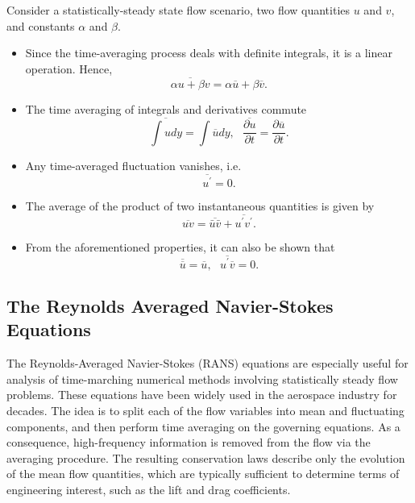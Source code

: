 Consider a statistically-steady state flow scenario, two flow quantities $u$ and $v$, and constants $\alpha$ and $\beta$.

\begin{itemize}
\item Since the time-averaging process deals with definite integrals, it is a linear operation. Hence, 
\begin{equation}
	\overline{\alpha u + \beta v} = \alpha \overline{u} + \beta \overline{v}.
	\label{eq:reynolds_sum}
\end{equation}
\item The time averaging of integrals and derivatives commute
\begin{equation}
	\overline{\int u dy} = \int \overline{u} dy,  ~~~ \overline{\frac{\partial u}{\partial t}} = \frac{\partial \overline{u}}{\partial t}.
	\label{eq:reynolds_commute}
\end{equation}
\item Any time-averaged fluctuation vanishes, i.e. 
\begin{equation}
	\overline{u^\prime}=0.
	\label{eq:reynolds_fluct}
\end{equation}
\item The average of the product of two instantaneous quantities is given by
\begin{equation}
	\overline{uv} = \overline{\bar{u}\bar{v}} + \overline{u^\prime v^\prime}.
	\label{eq:reynolds_prod}
\end{equation}
\item From the aforementioned properties, it can also be shown that
\begin{equation}
	\overline{\overline{u}} = \overline{u}, ~~~ \overline{u^\prime \overline{v}} = 0.
	\label{eq:reynolds_avgfluct}
\end{equation}
\end{itemize}

\subsection{The Reynolds Averaged Navier-Stokes Equations}

The Reynolds-Averaged Navier-Stokes (RANS) equations are especially useful for analysis of time-marching numerical methods involving statistically steady flow problems. These equations have been widely used in the aerospace industry for decades. The idea is to split each of the flow variables into mean and fluctuating components, and then perform time averaging on the governing equations. As a consequence, high-frequency information is removed from the flow via the averaging procedure. The resulting conservation laws describe only the evolution of the mean flow quantities, which are typically sufficient to determine terms of engineering interest, such as the lift and drag coefficients.

